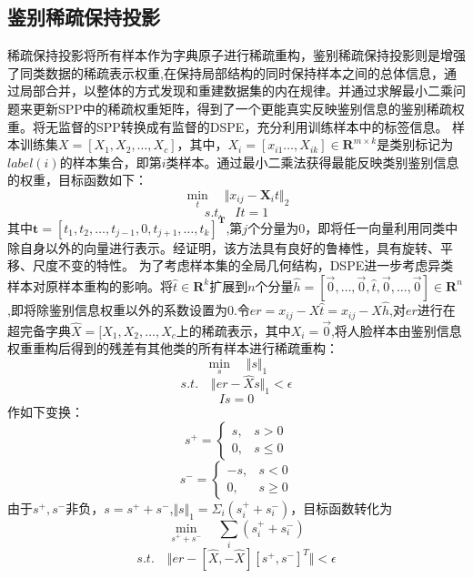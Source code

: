 \subsection{鉴别稀疏保持投影}
稀疏保持投影\cite{qiao2010sparsity}将所有样本作为字典原子进行稀疏重构，鉴别稀疏保持投影则是增强了同类数据的稀疏表示权重\cite{马小虎2014基于鉴别稀疏保持嵌入的人脸识别算法},在保持局部结构的同时保持样本之间的总体信息，通过局部合并，以整体的方式发现和重建数据集的内在规律。并通过求解最小二乘问题来更新SPP中的稀疏权重矩阵，得到了一个更能真实反映鉴别信息的鉴别稀疏权重。将无监督的SPP转换成有监督的DSPE，充分利用训练样本中的标签信息。
样本训练集$X=[X_{1},X_{2},\ldots,X_{c}]$，其中，$X_{i}=[x_{i1}\ldots,X_{ik}]\in \mathbf{R}^{m\times k}$是类别标记为$label(i)$的样本集合，即第$i$类样本。通过最小二乘法获得最能反映类别鉴别信息的权重，目标函数如下：
$$\min_{t}\quad\Vert x_{ij} - \mathbf{X}_{i}t\Vert_{2}$$
$$s.t.\quad It = 1$$
其中$\mathbf{t}=[t_{1},t_{2},\ldots,t_{j-1},0,t_{j+1},\ldots,t_{k}]^{\mathbf{T}}$,第$j$个分量为0，即将任一向量利用同类中除自身以外的向量进行表示。经证明\cite{马小虎2014基于鉴别稀疏保持嵌入的人脸识别算法}，该方法具有良好的鲁棒性，具有旋转、平移、尺度不变的特性。
为了考虑样本集的全局几何结构，DSPE进一步考虑异类样本对原样本重构的影响。将$\hat{t}\in \mathbf{R}^k$扩展到$n$个分量$\hat{h}=[\vec{0},\ldots,\vec{0},\hat{t},\vec{0},\ldots,\vec{0}]\in \mathbf{R}^{n}$,即将除鉴别信息权重以外的系数设置为0.令$er=x_{ij}-X\hat{t}=x_{ij}-X\hat{h}$,对$er$进行在超完备字典$\hat{X}=[X_{1},X_{2},\ldots,X_{c}$上的稀疏表示，其中$X_{i}=\vec{0}$,将人脸样本由鉴别信息权重重构后得到的残差有其他类的所有样本进行稀疏重构：
$$\min_{s}\quad\Vert{s}\Vert_{1}$$
$$s.t.\quad\Vert{er-\hat{X}s}\Vert_{1}<\epsilon$$
$$ Is = 0$$
作如下变换：
\begin{displaymath}
s^{+} = \left\{ 
	\begin{array}{ll}
 		s, & s>0\\
 		0, & s\le{0}
  	\end{array} \right.
\end{displaymath}
\begin{displaymath}
s^{-} = \left\{ \begin{array}{ll}
		-s,&s<0\\
		0, &s\ge{0}
		\end{array}\right.
\end{displaymath}
由于$s^{+},s^{-}$非负，$s=s^{+}+s^{-}$,$\Vert{s}\Vert_{1} = \Sigma_{i}(s_{i}^{+}+s_{i}^{-})$，目标函数转化为
$$\min_{s^{+}+s^{-}}\quad\sum_{i}(s_{i}^{+}+s_{i}^{-})$$
$$s.t.\quad \Vert{er-[\hat{X},-\hat{X}][s^{+},s^{-}]^{T}}\Vert < \epsilon$$
